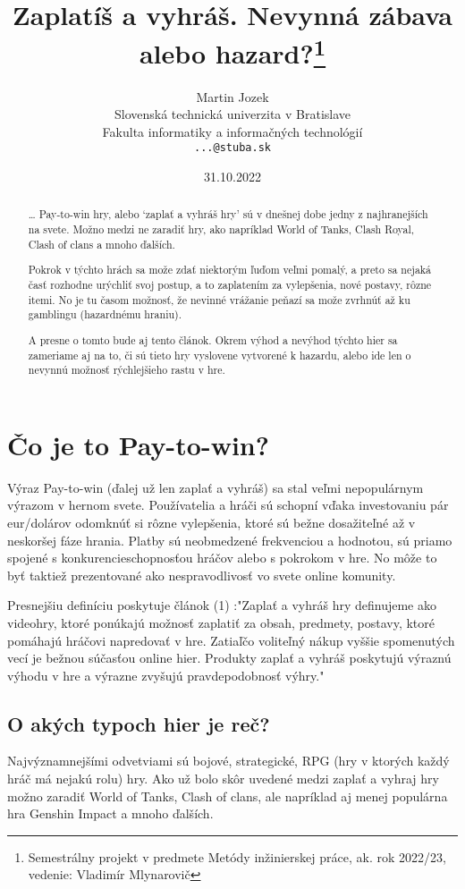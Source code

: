 \documentclass[10pt,twoside,slovak,a4paper]{article}
\title{Zaplatíš a vyhráš. Nevynná zábava alebo hazard?\thanks{Semestrálny projekt v predmete Metódy inžinierskej práce, ak. rok 2022/23, vedenie: Vladimír Mlynarovič}} %
\author{Martin Jozek\\[2pt]
	{\small Slovenská technická univerzita v Bratislave}\\
	{\small Fakulta informatiky a informačných technológií}\\
	{\small \texttt{...@stuba.sk}}
	}
\date{\small 31.10.2022} %
\begin{document}
\maketitle

\begin{abstract}
\ldots
Pay-to-win hry, alebo ‘zaplať a vyhráš hry’ sú v dnešnej dobe jedny z najhranejších na svete. Možno medzi ne zaradiť hry, ako napríklad World of Tanks, Clash Royal, Clash of clans a mnoho ďalších.

Pokrok v týchto hrách sa može zdať niektorým ľuďom veľmi pomalý, a preto sa nejaká časť rozhodne urýchliť svoj postup, a to zaplatením za vylepšenia, nové postavy, rôzne itemi. No je tu časom možnosť, že nevinné vrážanie peňazí sa može zvrhnúť až ku gamblingu (hazardnému hraniu). 

A presne o tomto bude aj tento článok. Okrem výhod a nevýhod týchto hier sa zameriame aj na to, či sú tieto hry vyslovene vytvorené k hazardu, alebo ide len o nevynnú možnosť rýchlejšieho rastu v hre.
\end{abstract}


\section{Čo je to Pay-to-win?} \label{2}
Výraz Pay-to-win (ďalej už len zaplať a vyhráš)  sa stal veľmi nepopulárnym výrazom v hernom svete. Používatelia a hráči sú schopní vďaka investovaniu pár eur/dolárov odomknúť si rôzne vylepšenia, ktoré sú bežne dosažiteľné až v neskoršej fáze hrania. Platby sú neobmedzené frekvenciou a hodnotou, sú priamo spojené s konkurencieschopnosťou hráčov alebo s pokrokom v hre. No môže to byť taktiež prezentované ako nespravodlivosť vo svete online komunity.

Presnejšiu definíciu poskytuje článok  (1) :"Zaplať a vyhráš hry definujeme ako videohry, ktoré ponúkajú možnosť zaplatiť za obsah, predmety, postavy, ktoré pomáhajú hráčovi napredovať v hre. Zatiaľčo voliteľný nákup vyššie spomenutých vecí je bežnou súčasťou online hier. Produkty zaplať a vyhráš poskytujú výraznú   výhodu v hre a výrazne zvyšujú pravdepodobnosť výhry."

\subsection{O akých typoch hier je reč?} \label{2.1}
Najvýznamnejšími odvetviami sú bojové, strategické, RPG (hry v ktorých každý hráč má nejakú rolu) hry. Ako už bolo skôr uvedené  medzi zaplať a vyhraj hry možno zaradiť World of Tanks, Clash of clans, ale napríklad aj menej populárna hra Genshin Impact a mnoho ďalších.
\end{document}
